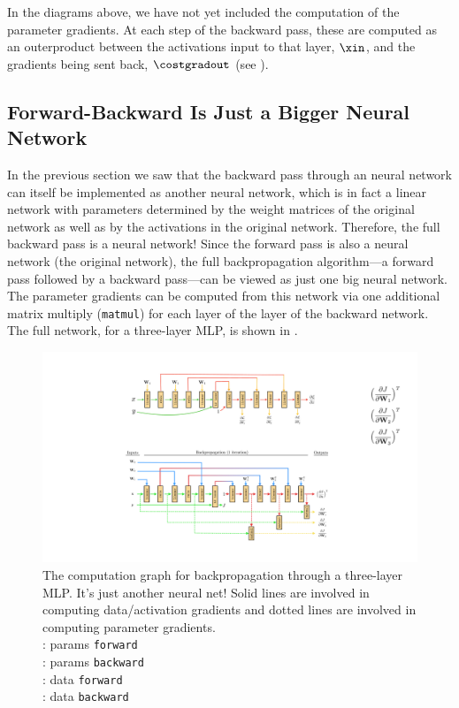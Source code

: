 In the diagrams above, we have not yet included the computation of the parameter gradients. At each step of the backward pass, these are computed as an outerproduct between the activations input to that layer, $\xin$, and the gradients being sent back, $\costgradout$ (see \fig{\ref{fig:backpropagation:parameter_grad_linear_matrices}}).

\subsection{Forward-Backward Is Just a Bigger Neural Network}\label{section:backpropagation:backprop_as_neural_net}

In the previous section we saw that the backward pass through an neural network can itself be implemented as another neural network, which is in fact a linear network with parameters determined by the weight matrices of the original network as well as by the activations in the original network. Therefore, the full backward pass is a neural network! Since the forward pass is also a neural network (the original network), the full backpropagation algorithm—a forward pass followed by a backward pass—can be viewed as just one big neural network. The parameter gradients can be computed from this network via one additional matrix multiply (\texttt{matmul}) for each layer of the layer of the backward network. The full network, for a three-layer MLP, is shown in \fig{\ref{fig:backpropagation:backprop_as_neural_net}}.
\begin{figure}[h!]
    \centerline{
        \includegraphics[width=1.0\linewidth]{./figures/backpropagation/backprop_as_neural_net.pdf}
    }
    \caption{The computation graph for backpropagation through a three-layer MLP. It's just another neural net! Solid lines are involved in computing data/activation gradients and dotted lines are involved in computing parameter gradients.\\ \hfill \break\raisebox{0.5mm}{\textcolor{comp_graph_param_bcolor}{\rule{4mm}{2pt}}} : params \texttt{forward}\\\raisebox{0.5mm}{\textcolor{backwardpropcolor_params}{\rule{4mm}{2pt}}} : params \texttt{backward}\\\raisebox{0.5mm}{\textcolor{forwardpropcolor}{\rule{4mm}{2pt}}} : data \texttt{forward}\\\raisebox{0.5mm}{\textcolor{backwardpropcolor}{\rule{4mm}{2pt}}} : data \texttt{backward}}
    \label{fig:backpropagation:backprop_as_neural_net}
\end{figure}

